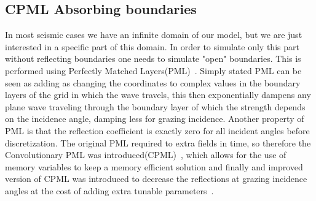 \documentclass[10pt]{SelfArx} %
\theoremstyle{definition}
\begin{document}
\subsection{CPML Absorbing boundaries}
In most seismic cases we have an infinite domain of our model, but we are just interested in a specific part of this domain. In order to simulate only this part without reflecting boundaries one needs to simulate "open" boundaries.
This is performed using Perfectly Matched Layers(PML)~\cite{Berenger1994}. Simply stated PML can be seen as adding as changing the coordinates to complex values in the boundary layers of the grid in which the wave travels, this then exponentially dampens any plane wave traveling through the boundary layer of which the strength depends on the incidence angle, damping less for grazing incidence. Another property of PML is that the reflection coefficient is exactly zero for all incident angles before discretization. The original PML required to extra fields in time, so therefore the Convolutionary PML was introduced(CPML)~\cite{Roden2000}, which allows for the use of memory variables to keep a memory efficient solution and finally and improved version of CPML was introduced to decrease the reflections at grazing incidence angles at the cost of adding extra tunable parameters~\cite{Komatitsch2007}. 
\end{document}
